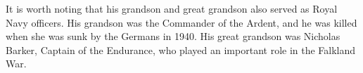 It is worth noting that his grandson and great grandson also served as Royal Navy officers. His grandson was the Commander of the Ardent, and he was killed when she was sunk by the Germans in 1940. His great grandson was Nicholas Barker, Captain of the Endurance, who played an important role in the Falkland War.

